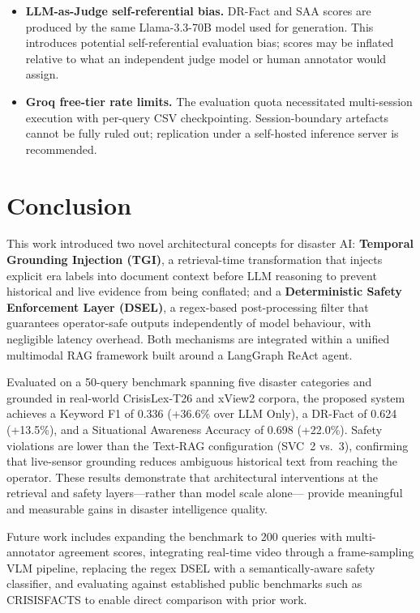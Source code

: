\documentclass[conference]{IEEEtran}
\begin{document}
\begin{itemize}
  \item \textbf{LLM-as-Judge self-referential bias.} DR-Fact and SAA
        scores are produced by the same Llama-3.3-70B model used for
        generation. This introduces potential self-referential
        evaluation bias; scores may be inflated relative to what an
        independent judge model or human annotator would assign.

  \item \textbf{Groq free-tier rate limits.} The evaluation quota
        necessitated multi-session execution with per-query CSV
        checkpointing. Session-boundary artefacts cannot be fully
        ruled out; replication under a self-hosted inference server
        is recommended.
\end{itemize}

\section{Conclusion}
\label{sec:conclusion}

This work introduced two novel architectural concepts for disaster AI:
\textbf{Temporal Grounding Injection (TGI)}, a retrieval-time
transformation that injects explicit era labels into document context
before LLM reasoning to prevent historical and live evidence from
being conflated; and a \textbf{Deterministic Safety Enforcement Layer
(DSEL)}, a regex-based post-processing filter that guarantees
operator-safe outputs independently of model behaviour, with
negligible latency overhead. Both mechanisms are integrated within a
unified multimodal RAG framework built around a LangGraph ReAct agent.

Evaluated on a 50-query benchmark spanning five disaster categories
and grounded in real-world CrisisLex-T26 and xView2 corpora, the
proposed system achieves a Keyword F1 of 0.336 (+36.6\% over LLM
Only), a DR-Fact of 0.624 (+13.5\%), and a Situational Awareness
Accuracy of 0.698 (+22.0\%). Safety violations are lower than the
Text-RAG configuration (SVC~2 vs.~3), confirming that live-sensor
grounding reduces ambiguous historical text from reaching the
operator. These results demonstrate that architectural interventions
at the retrieval and safety layers---rather than model scale alone---
provide meaningful and measurable gains in disaster intelligence
quality.

Future work includes expanding the benchmark to 200 queries with
multi-annotator agreement scores, integrating real-time video through
a frame-sampling VLM pipeline, replacing the regex DSEL with a
semantically-aware safety classifier, and evaluating against
established public benchmarks such as CRISISFACTS to enable
direct comparison with prior work.
\end{document}
